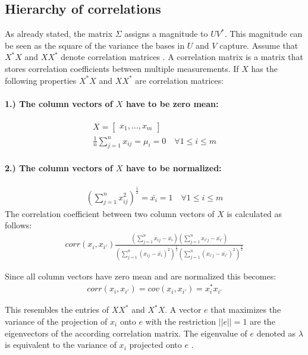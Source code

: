 \subsection{Hierarchy of correlations}
As already stated, the matrix \(\Sigma\) assigns a magnitude to \(UV^{*}\).
This magnitude can be seen as the square of the variance the bases in \(U\) and \(V\) capture.
Assume that \(X^{*}X\) and \(XX^{*}\) denote correlation matrices
\cite{brunton_kutz_2019b}.
A correlation matrix is a matrix that stores correlation coefficients between multiple measurements. 
If \(X\) has the following properties \(X^{*}X\) and \(XX^{*}\) are correlation matrices:
\paragraph{1.) The column vectors of \(X\) have to be zero mean:}
\begin{gather}
X = \begin{bmatrix}
x_1, \hdots, x_m
\end{bmatrix} \\
\frac{1}{n}\sum_{j = 1}^{n} x_{ij} = \mu_{i} = 0 \quad \forall 1 \leq i \leq m
\end{gather}
\paragraph{2.) The column vectors of \(X\) have to be normalized:}
\begin{gather}
(\sum_{j = 1}^{n} x_{ij}^{2})^{\frac{1}{2}} = \bar{x_i} = 1 \quad \forall 1 \leq i \leq m
\end{gather}
The correlation coefficient between two column vectors of \(X\) is calculated as follows:
\begin{gather}
corr(x_i, x_{i'})\frac{(\sum_{j = 1}^{n} x_{ij} - \bar{x_i})(\sum_{j = 1}^{n} x_{i'j} - \bar{x_{i'}})}{(\sum_{j = 1}^{n} (x_{ij}- \bar{x_{i}})^{2})^{\frac{1}{2}}(\sum_{j = 1}^{n} (x_{i'j}-  \bar{x_{i'}})^{2})^{\frac{1}{2}}}
\end{gather}
\cite{Suga}


Since all column vectors have zero mean and are normalized this becomes:
\begin{gather}
corr(x_i, x_{i'}) = cov(x_i, x_{i'})= x_i^{*}x_{i'}
\end{gather}
\cite{harv}


This resembles the entries of \(XX^{*}\) and \(X^{*}X\).
A vector \(e\) that maximizes the variance of the projection of \(x_i\) onto \(e\)  with the restriction \(||e|| = 1\) are the eigenvectors of the according correlation matrix.
The eigenvalue of \(e\) denoted as \(\lambda\) is equivalent to the variance of \(x_i\) projected onto \(e\) \cite{Lavrenko}.

